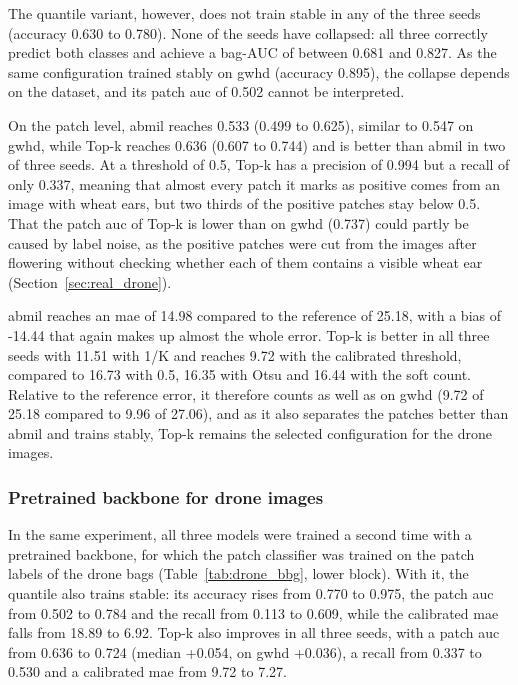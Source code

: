 \documentclass[12pt,parskip = half, DIV=classic,listof=totoc]{scrartcl}
\begin{document}
			The quantile variant, however, does not train stable in any of the three seeds (accuracy 0.630 to 0.780). 
			None of the seeds have collapsed: all three correctly predict both classes and
			achieve a bag-AUC of between 0.681 and 0.827. As the same configuration 
			trained stably on \ac{gwhd} (accuracy 0.895), the collapse depends on the dataset, 
			and its patch \ac{auc} of 0.502 cannot be interpreted.

			On the patch level, \ac{abmil} reaches 0.533 (0.499 to 0.625), similar to 0.547 on \ac{gwhd}, while Top-k 
			reaches 0.636 (0.607 to 0.744) and is better than \ac{abmil} in two of three seeds. At a threshold of 
			0.5, Top-k has a precision of 0.994 but a recall of only 0.337, meaning that almost every patch 
			it marks as positive comes from an image with wheat ears, but two thirds of the positive patches 
			stay below 0.5. That the patch \ac{auc} of Top-k is lower than on \ac{gwhd} (0.737) could partly be caused 
			by label noise, as the positive patches were cut from the images after flowering without checking 
			whether each of them contains a visible wheat ear (Section~\ref{sec:real_drone}).

			\Ac{abmil} reaches an \ac{mae} of 14.98 compared to the reference of 25.18, with a bias of -14.44 that 
			again makes up almost the whole error. Top-k is better in all three seeds with 11.51 with 
			1/K and reaches 9.72 with the calibrated threshold, compared to 16.73 with 0.5, 16.35 with Otsu and 16.44 with 
			the soft count. Relative to the reference error, it therefore counts as well as on \ac{gwhd} 
			(9.72 of 25.18 compared to 9.96 of 27.06), and as it also separates the patches better than 
			\ac{abmil} and trains stably, Top-k remains the selected configuration for the drone images.

			\subsubsection{Pretrained backbone for drone images}

			In the same experiment, all three models were trained a second time with a pretrained backbone, 
			for which the patch classifier was trained on the patch labels of the drone bags (Table~\ref{tab:drone_bbg}, lower block). 
			With it, the quantile also trains stable: its accuracy rises from 0.770 to 0.975, 
			the patch \ac{auc} from 0.502 to 0.784 and the recall from 0.113 to 0.609, while the calibrated 
			\ac{mae} falls from 18.89 to 6.92. Top-k also improves in all three seeds, with a patch \ac{auc} from 
			0.636 to 0.724 (median +0.054, on \ac{gwhd} +0.036), a recall from 0.337 to 0.530 and a calibrated 
			\ac{mae} from 9.72 to 7.27.
\end{document}
